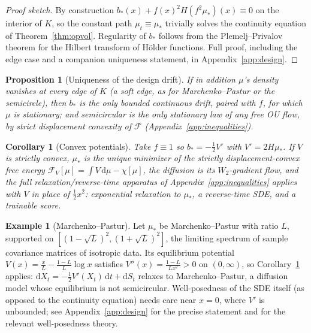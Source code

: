 \documentclass[11pt]{article}
\newcommand{\dd}{\mathrm{d}}
\newcommand{\Wt}{W_{2}}
\newcommand{\Ent}{\chi}
\theoremstyle{plain}
\newtheorem{proposition}[theorem]{Proposition}
\newtheorem{corollary}[theorem]{Corollary}
\theoremstyle{definition}
\newtheorem{example}[theorem]{Example}
\theoremstyle{remark}
\begin{document}
\begin{proof}[Proof sketch]
By construction $b_*(x)+f(x)^2H(f^2\mu_*)(x)\equiv0$ on the interior of $K$, so the
constant path $\mu_t\equiv\mu_*$ trivially solves the continuity equation of
Theorem~\ref{thm:opvol}. Regularity of $b_*$ follows from the Plemelj--Privalov
theorem for the Hilbert transform of H\"older functions. Full proof, including the
edge case and a companion uniqueness statement, in Appendix~\ref{app:design}.
\end{proof}

\begin{proposition}[Uniqueness of the design drift]\label{prop:designunique}
If in addition $\mu$'s density vanishes at every edge of $K$ (a soft edge, as for
Marchenko--Pastur or the semicircle), then $b_*$ is the \emph{only} bounded continuous
drift, paired with $f$, for which $\mu$ is stationary; and semicircular is the only
stationary law of any free OU flow, by strict displacement
convexity of $\mathcal F$ (Appendix~\ref{app:inequalities}).
\end{proposition}

\begin{corollary}[Convex potentials]\label{cor:designconvex}
Take $f\equiv1$ so $b_* = -\tfrac12 V'$ with $V'=2H\mu_*$. If $V$ is strictly convex,
$\mu_*$ is the unique minimizer of the strictly displacement-convex free energy
$\mathcal F_V[\mu]=\int V\,\dd\mu - \Ent[\mu]$, the diffusion is its
$\Wt$-gradient flow, and the full relaxation/reverse-time apparatus of
Appendix~\ref{app:inequalities} applies with $V$ in place of $\tfrac12x^2$:
exponential relaxation to $\mu_*$, a reverse-time SDE, and a trainable score.
\end{corollary}

\begin{example}[Marchenko--Pastur]\label{ex:mp}
Let $\mu_*$ be Marchenko--Pastur with ratio $L$, supported on
$[(1-\sqrt L)^2,(1+\sqrt L)^2]$, the limiting spectrum of sample covariance matrices of isotropic data.
Its equilibrium potential $V(x)=\tfrac{x}{L}-\tfrac{1-L}{L}\log x$ satisfies
$V''(x)=\tfrac{1-L}{Lx^2}>0$ on $(0,\infty)$, so Corollary~\ref{cor:designconvex}
applies: $\dd X_t = -\tfrac12V'(X_t)\,\dd t+\dd S_t$ relaxes to Marchenko--Pastur, a
diffusion model whose equilibrium is not semicircular. Well-posedness of the SDE
itself (as opposed to the continuity equation) needs care near $x=0$, where $V'$ is
unbounded; see Appendix~\ref{app:design} for the precise statement and
\citet{WeiYin2026} for the relevant well-posedness theory.
\end{example}
\end{document}
